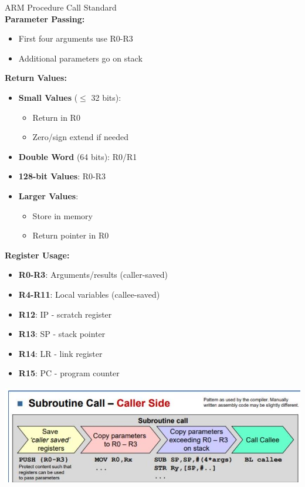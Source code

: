 \begin{definition}{ARM Procedure Call Standard}\\
\textbf{Parameter Passing:}
\begin{itemize}
  \item First four arguments use R0-R3
  \item Additional parameters go on stack
\end{itemize}

\textbf{Return Values:}
\begin{itemize}
  \item \textbf{Small Values} ($\leqslant$ 32 bits): 
    \begin{itemize}
      \item Return in R0
      \item Zero/sign extend if needed
    \end{itemize}
  \item \textbf{Double Word} (64 bits): R0/R1
  \item \textbf{128-bit Values}: R0-R3
  \item \textbf{Larger Values}: 
    \begin{itemize}
      \item Store in memory
      \item Return pointer in R0
    \end{itemize}
\end{itemize}

\textbf{Register Usage:}
\begin{itemize}
  \item \textbf{R0-R3}: Arguments/results (caller-saved)
  \item \textbf{R4-R11}: Local variables (callee-saved)
  \item \textbf{R12}: IP - scratch register
  \item \textbf{R13}: SP - stack pointer
  \item \textbf{R14}: LR - link register
  \item \textbf{R15}: PC - program counter
\end{itemize}

\includegraphics[width=\linewidth]{images/2024_12_29_79e6b22f503fb7b4f718g-09(3)}
\end{definition}












